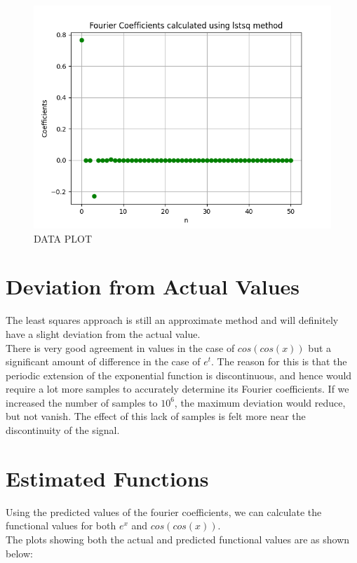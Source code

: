 \documentclass[11pt, a4paper]{article}
\begin{document}
   \begin{figure}[!tbh]
   	\centering
   	\includegraphics[scale=0.6]{Figure9.png}   
   	\caption{DATA PLOT}
   	\label{fig:sample}
   \end{figure} 
     
\section{Deviation from Actual Values} 
The least squares approach is still an approximate method and will definitely have a slight deviation from the actual value.\\

There is very good agreement in values in the case of $cos(cos(x))$ but a significant amount of difference in the case of $e^{t}$. The reason for this is that the periodic extension of the exponential function is discontinuous, and hence would require a lot more samples to accurately determine its Fourier coefficients. If we increased the number of samples to $10^{6}$, the maximum deviation would reduce, but not vanish.
The effect of this lack of samples is felt more near the discontinuity of the signal.


\section{Estimated Functions}
Using the predicted values of the fourier coefficients, we can calculate the functional values for both $e^{x}$ and $cos(cos(x))$. \\
The plots showing both the actual and predicted functional values are as shown below:
\end{document}
